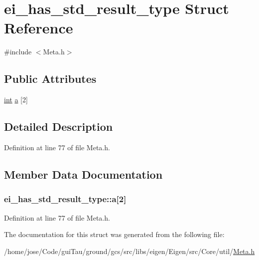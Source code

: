 \hypertarget{structei__has__std__result__type}{\section{ei\-\_\-has\-\_\-std\-\_\-result\-\_\-type Struct Reference}
\label{structei__has__std__result__type}
}


{\ttfamily \#include $<$Meta.\-h$>$}

\subsection*{Public Attributes}
\begin{DoxyCompactItemize}
\item 
\hyperlink{ioapi_8h_a787fa3cf048117ba7123753c1e74fcd6}{int} \hyperlink{structei__has__std__result__type_a577828f69b94399b9ed371efe29151b9}{a} \mbox{[}2\mbox{]}
\end{DoxyCompactItemize}


\subsection{Detailed Description}


Definition at line 77 of file Meta.\-h.



\subsection{Member Data Documentation}
\hypertarget{structei__has__std__result__type_a577828f69b94399b9ed371efe29151b9}{
\subsubsection[{a}]{ ei\-\_\-has\-\_\-std\-\_\-result\-\_\-type\-::a\mbox{[}2\mbox{]}}}\label{structei__has__std__result__type_a577828f69b94399b9ed371efe29151b9}


Definition at line 77 of file Meta.\-h.



The documentation for this struct was generated from the following file\-:\begin{DoxyCompactItemize}
\item 
/home/jose/\-Code/gui\-Tau/ground/gcs/src/libs/eigen/\-Eigen/src/\-Core/util/\hyperlink{_meta_8h}{Meta.\-h}\end{DoxyCompactItemize}
